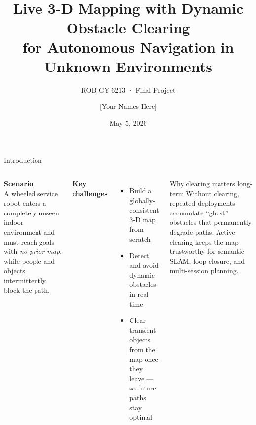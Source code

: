 \documentclass[aspectratio=169, 10pt]{beamer}
\title{Live 3-D Mapping with Dynamic Obstacle Clearing\\
       for Autonomous Navigation in Unknown Environments}
\subtitle{ROB-GY 6213 \;·\; Final Project}
\author{[Your Names Here]}
\institute{New York University \;·\; Tandon School of Engineering}
\date{May 5, 2026}
\begin{document}

\maketitle

\begin{frame}{Introduction}
\begin{columns}[T]

  \textbf{Scenario}\\[3pt]
  \small
  A wheeled service robot enters a \alert{completely unseen} indoor
  environment and must reach goals with \emph{no prior map},
  while people and objects intermittently block the path.

  \vspace{5pt}
  \normalsize\textbf{Key challenges}
  \begin{itemize}\small
    \item Build a globally-consistent 3-D map from scratch
    \item Detect and avoid dynamic obstacles in real time
    \item \alert{Clear} transient objects from the map once they
          leave — so future paths stay optimal
  \end{itemize}

  \vspace{5pt}
  \begin{exampleblock}{\small Why clearing matters long-term}
    \small Without clearing, repeated deployments accumulate
    ``ghost'' obstacles that permanently degrade paths.
    Active clearing keeps the map trustworthy for semantic
    SLAM, loop closure, and multi-session planning.
  \end{exampleblock}

  \vspace{4pt}
  \centering
\end{columns}
\end{frame}
\end{document}
